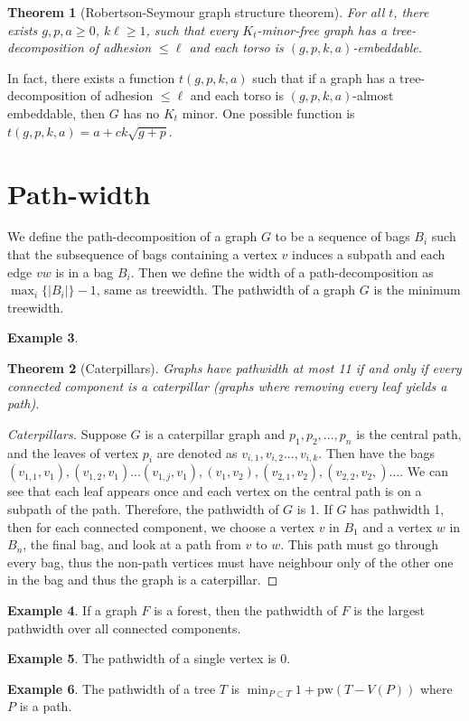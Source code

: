 \documentclass[]{article}
\newcommand{\pw}{\text{pw}}
\newtheorem{theorem}{Theorem}
\theoremstyle{definition}
\newtheorem{example}[theorem]{Example}
\numberwithin{theorem}{section}
\numberwithin{equation}{section}
\begin{document}
\begin{theorem}[Robertson-Seymour graph structure theorem]
	For all $t$, there exists $g, p, a \geq 0$, $k \ell \geq 1$, such that every $K_t$-minor-free graph has a tree-decomposition of adhesion $\leq \ell$ and each torso is $(g, p, k, a)$-embeddable. 
\end{theorem}
In fact, there exists a function $t(g, p, k, a)$ such that if a graph has a tree-decomposition of adhesion $\leq \ell$ and each torso is $(g, p, k, a)$-almost embeddable, then $G$ has no $K_t$ minor. One possible function is $t(g, p, k, a) = a + ck \sqrt{g + p}$. 

\section{Path-width}
We define the path-decomposition of a graph $G$ to be a sequence of bags $B_i$ such that the subsequence of bags containing a vertex $v$ induces a subpath and each edge $vw$ is in a bag $B_i$. Then we define the width of a path-decomposition as $\max_i \lbrace |B_i| \rbrace -1$, same as treewidth. The pathwidth of a graph $G$ is the minimum treewidth.
\begin{example}
	\begin{theorem}[Caterpillars]
		Graphs have pathwidth at most 11 if and only if every connected component is a caterpillar (graphs where removing every leaf yields a path).
	\end{theorem}
	\begin{proof}[Caterpillars]
		Suppose $G$ is a caterpillar graph and $p_1, p_2, ..., p_n$ is the central path, and the leaves of vertex $p_i$ are denoted as $v_{i, 1}, v_{i, 2} ..., v_{i, k}$. Then have the bags $(v_{1, 1}, v_1), (v_{1, 2}, v_1)... (v_{1, j}, v_1), (v_1, v_2), (v_{2, 1}, v_2), (v_{2,2}, v_2,)... $. We can see that each leaf appears once and each vertex on the central path is on a subpath of the path. Therefore, the pathwidth of $G$ is 1. If $G$ has pathwidth 1, then for each connected component, we choose a vertex $v$ in $B_1$ and a vertex $w$ in $B_n$, the final bag, and look at a path from $v$ to $w$. This path must go through every bag, thus the non-path vertices must have neighbour only of the other one in the bag and thus the graph is a caterpillar. 
	\end{proof}
	
\end{example}
\begin{example}
	If a graph $F$ is a forest, then the pathwidth of $F$ is the largest pathwidth over all connected components.
\end{example}
\begin{example}
	The pathwidth of a single vertex is 0.
\end{example}
\begin{example}
	The pathwidth of a tree $T$ is $\min_{P \subset T} 1 + \pw(T - V(P))$ where $P$ is a path. 
\end{example}
\end{document}
